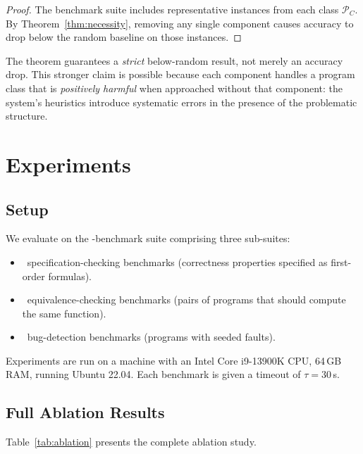 \documentclass[11pt]{article}
\newcommand{\PClass}[1]{\mathcal{P}_{#1}}   %
\begin{document}
\begin{proof}
The benchmark suite includes representative instances from each class
$\PClass{C}$.  By Theorem~\ref{thm:necessity}, removing any single
component causes accuracy to drop below the random baseline on those
instances.
\end{proof}

\begin{remark}
The theorem guarantees a \emph{strict} below-random result, not merely
an accuracy drop.  This stronger claim is possible because each
component handles a program class that is \emph{positively harmful}
when approached without that component: the system's heuristics
introduce systematic errors in the presence of the problematic
structure.
\end{remark}

\section{Experiments}
\label{sec:experiments}

\subsection{Setup}
\label{subsec:setup}

We evaluate on the \numcases-benchmark suite comprising three sub-suites:
\begin{itemize}
\item \numspec\ specification-checking benchmarks (correctness
  properties specified as first-order formulas).
\item \numeq\ equivalence-checking benchmarks (pairs of programs
  that should compute the same function).
\item \numbug\ bug-detection benchmarks (programs with seeded faults).
\end{itemize}

Experiments are run on a machine with an Intel Core i9-13900K CPU,
64\,GB RAM, running Ubuntu 22.04.  Each benchmark is given a timeout
of $\tau = 30$\,s.

\subsection{Full Ablation Results}
\label{subsec:full-ablation}

Table~\ref{tab:ablation} presents the complete ablation study.
\end{document}
